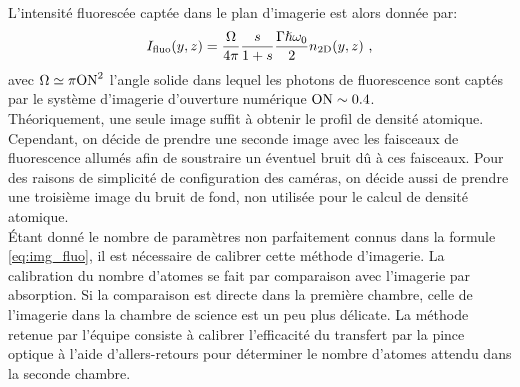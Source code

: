 L'intensité fluorescée captée dans le plan d'imagerie est alors donnée par:
\begin{equation}
I_{\mathrm{fluo}}(y,z)=\frac{\Omega}{4\pi} \frac{s}{1+s} \frac{ \Gamma \hslash \omega_0}{2} n_{\mathrm{2D}}(y,z) \text{ ,}
\label{eq:img_fluo}
\end{equation}
avec $\Omega \simeq \pi \mathrm{ON}^2$ l'angle solide dans lequel les photons de fluorescence sont captés par le système d'imagerie d'ouverture numérique $\mathrm{ON}\sim 0.4$. \\
Théoriquement, une seule image suffit à obtenir le profil de densité atomique. Cependant, on décide de prendre une seconde image avec les faisceaux de fluorescence allumés afin de soustraire un éventuel bruit dû à ces faisceaux. Pour des raisons de simplicité de configuration des caméras, on décide aussi de prendre une troisième image du bruit de fond, non utilisée pour le calcul de densité atomique.\\
Étant donné le nombre de paramètres non parfaitement connus dans la formule \ref{eq:img_fluo}, il est nécessaire de calibrer cette méthode d'imagerie. La calibration du nombre d'atomes se fait par comparaison avec l'imagerie par absorption. Si la comparaison est directe dans la première chambre, celle de l'imagerie dans la chambre de science est un peu plus délicate. La méthode retenue par l'équipe consiste à calibrer l'efficacité du transfert par la pince optique à l'aide d'allers-retours pour déterminer le nombre d'atomes attendu dans la seconde chambre.


